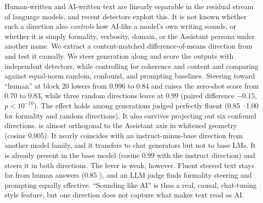 Human-written and AI-written text are linearly separable in the residual stream of language models, and recent detectors exploit this. It is not known whether such a direction also \emph{controls} how AI-like a model's own writing sounds, or whether it is simply formality, verbosity, domain, or the Assistant persona under another name.
We extract a content-matched difference-of-means direction \dai from \qwen and test it causally. We steer generation along \dai and score the outputs with independent detectors, while controlling for coherence and content and comparing against equal-norm random, confound, and prompting baselines.
Steering toward ``human'' at block 20 lowers \desklib \pai from 0.996 to 0.84 and raises the zero-shot \binoculars score from 0.70 to 0.83, while three random directions leave \desklib at 0.99 (paired difference $-0.15$, $p<10^{-10}$). The effect holds among generations judged perfectly fluent (0.85 --1.00 for formality and random directions). It also survives projecting out six confound directions.
\dai is almost orthogonal to the Assistant axis in whitened geometry (cosine 0.005). It nearly coincides with an instruct-minus-base direction from another model family, and it transfers to chat generators but not to base LMs. It is already present in the base model (cosine 0.99 with the instruct direction) and steers it in both directions.
The lever is weak, however. Fluent steered text stays far from human answers (0.85 ), and an LLM judge finds formality steering and prompting equally effective.
``Sounding like AI'' is thus a real, causal, chat-tuning style feature, but one direction does not capture what makes text read as AI.
